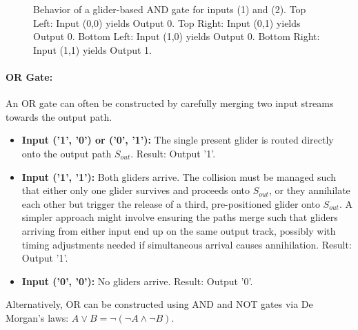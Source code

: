 \documentclass{article}
\theoremstyle{definition}
\theoremstyle{plain}
\theoremstyle{plain}
\begin{document}
\begin{figure}[H]
  \caption{Behavior of a glider-based AND gate for inputs (1) and (2). Top Left: Input (0,0) yields Output 0. Top Right: Input (0,1) yields Output 0. Bottom Left: Input (1,0) yields Output 0. Bottom Right: Input (1,1) yields Output 1. \cite{Carlini_2020}}
  \label{fig:and-gate}
\end{figure}

\paragraph{OR Gate:} An OR gate can often be constructed by carefully merging two input streams towards the output path.
\begin{itemize}
  \item \textbf{Input ('1', '0') or ('0', '1'):} The single present glider is routed directly onto the output path $S_{out}$. Result: Output '1'.
  \item \textbf{Input ('1', '1'):} Both gliders arrive. The collision must be managed such that either only one glider survives and proceeds onto $S_{out}$, or they annihilate each other but trigger the release of a third, pre-positioned glider onto $S_{out}$. A simpler approach might involve ensuring the paths merge such that gliders arriving from either input end up on the same output track, possibly with timing adjustments needed if simultaneous arrival causes annihilation. Result: Output '1'.
  \item \textbf{Input ('0', '0'):} No gliders arrive. Result: Output '0'.
\end{itemize}
Alternatively, OR can be constructed using AND and NOT gates via De Morgan's laws: $A \lor B = \neg (\neg A \land \neg B)$.
\end{document}
